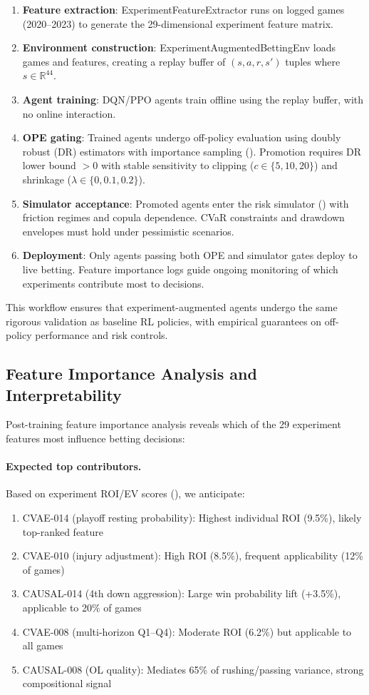 \begin{enumerate}
  \item \textbf{Feature extraction}: ExperimentFeatureExtractor runs on logged games (2020--2023) to generate the 29-dimensional experiment feature matrix.
  \item \textbf{Environment construction}: ExperimentAugmentedBettingEnv loads games and features, creating a replay buffer of $(s, a, r, s')$ tuples where $s \in \mathbb{R}^{44}$.
  \item \textbf{Agent training}: DQN/PPO agents train offline using the replay buffer, with no online interaction.
  \item \textbf{OPE gating}: Trained agents undergo off-policy evaluation using doubly robust (DR) estimators with importance sampling (). Promotion requires DR lower bound $> 0$ with stable sensitivity to clipping ($c \in \{5, 10, 20\}$) and shrinkage ($\lambda \in \{0, 0.1, 0.2\}$).
  \item \textbf{Simulator acceptance}: Promoted agents enter the risk simulator () with friction regimes and copula dependence. CVaR constraints and drawdown envelopes must hold under pessimistic scenarios.
  \item \textbf{Deployment}: Only agents passing both OPE and simulator gates deploy to live betting. Feature importance logs guide ongoing monitoring of which experiments contribute most to decisions.
\end{enumerate}

This workflow ensures that experiment-augmented agents undergo the same rigorous validation as baseline RL policies, with empirical guarantees on off-policy performance and risk controls.

\subsection{Feature Importance Analysis and Interpretability}

Post-training feature importance analysis reveals which of the 29 experiment features most influence betting decisions:

\paragraph{Expected top contributors.}
Based on experiment ROI/EV scores (), we anticipate:
\begin{enumerate}
  \item CVAE-014 (playoff resting probability): Highest individual ROI (9.5\%), likely top-ranked feature
  \item CVAE-010 (injury adjustment): High ROI (8.5\%), frequent applicability (12\% of games)
  \item CAUSAL-014 (4th down aggression): Large win probability lift (+3.5\%), applicable to 20\% of games
  \item CVAE-008 (multi-horizon Q1--Q4): Moderate ROI (6.2\%) but applicable to all games
  \item CAUSAL-008 (OL quality): Mediates 65\% of rushing/passing variance, strong compositional signal
\end{enumerate}

